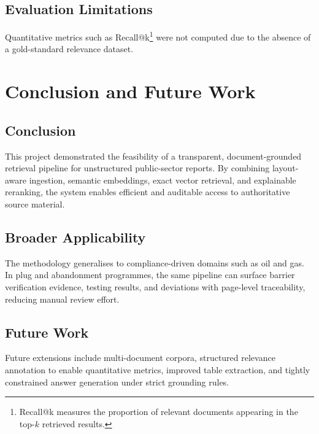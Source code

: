 \documentclass[12pt,a4paper]{report}
\begin{document}
\section{Evaluation Limitations}
Quantitative metrics such as Recall@k\footnote{Recall@k measures the proportion of relevant documents appearing in the top-$k$ retrieved results.} were not computed due to the absence of a gold-standard relevance dataset.

\chapter{Conclusion and Future Work}

\section{Conclusion}
This project demonstrated the feasibility of a transparent, document-grounded retrieval pipeline for unstructured public-sector reports. By combining layout-aware ingestion, semantic embeddings, exact vector retrieval, and explainable reranking, the system enables efficient and auditable access to authoritative source material.

\section{Broader Applicability}
The methodology generalises to compliance-driven domains such as oil and gas. In plug and abandonment programmes, the same pipeline can surface barrier verification evidence, testing results, and deviations with page-level traceability, reducing manual review effort.

\section{Future Work}
Future extensions include multi-document corpora, structured relevance annotation to enable quantitative metrics, improved table extraction, and tightly constrained answer generation under strict grounding rules.
\end{document}

